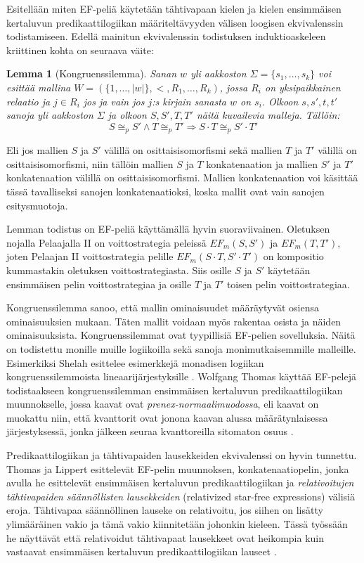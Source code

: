 \documentclass[finnish]{tktltiki2}
\newtheorem{lem}[lau]{Lemma}
\theoremstyle{definition}
\theoremstyle{remark}
\begin{document}
Esitellään miten EF-peliä käytetään tähtivapaan kielen ja kielen ensimmäisen kertaluvun predikaattilogiikan määriteltävyyden välisen loogisen ekvivalenssin todistamiseen. Edellä mainitun ekvivalenssin todistuksen induktioaskeleen kriittinen kohta on seuraava väite:

\begin{lem}[Kongruenssilemma]
Sanan $w$ yli aakkoston $\Sigma = \{s_1, \ldots, s_k\}$ voi esittää mallina $W = (\{1, \ldots, |w|\}, <, R_1, \ldots, R_k)$, jossa $R_i$ on yksipaikkainen relaatio ja $j \in R_i$ jos ja vain jos $j$:s kirjain sanasta $w$ on $s_i$. Olkoon $s, s', t, t'$ sanoja yli aakkoston $\Sigma$ ja olkoon $S, S', T , T'$ näitä kuvailevia malleja. Tällöin: \[ S \cong_p S' \land T \cong_p T' \Longrightarrow S \cdot T \cong_p S' \cdot T' \]
\end{lem}
Eli jos mallien $S$ ja $S'$ välillä on osittaisisomorfismi sekä mallien $T$ ja $T'$ välillä on osittaisisomorfismi, niin tällöin mallien $S$ ja $T$ konkatenaation ja mallien $S'$ ja $T'$ konkatenaation välillä on osittaisisomorfismi. Mallien konkatenaation voi käsittää tässä tavalliseksi sanojen konkatenaatioksi, koska mallit ovat vain sanojen esitysmuotoja.

Lemman todistus on EF-peliä käyttämällä hyvin suoraviivainen. Oletuksen nojalla Pelaajalla II on voittostrategia peleissä $EF_m(S, S')$ ja $EF_m(T, T')$, joten Pelaajan II voittostrategia pelille $EF_m(S \cdot T, S' \cdot T')$ on kompositio kummastakin oletuksen voittostrategiasta. Siis osille $S$ ja $S'$ käytetään ensimmäisen pelin voittostrategiaa ja osille $T$ ja $T'$ toisen pelin voittostrategiaa.

Kongruenssilemma sanoo, että mallin ominaisuudet määräytyvät osiensa ominaisuuksien mukaan. Täten mallit voidaan myös rakentaa osista ja näiden ominaisuuksista. Kongruenssilemmat ovat tyypillisiä EF-pelien sovelluksia. Näitä on todistettu monille muille logiikoilla sekä sanoja monimutkaisemmille malleille. Esimerkiksi Shelah esittelee esimerkkejä monadisen logiikan kongruenssilemmoista lineaarijärjestyksille \cite{She75}. Wolfgang Thomas käyttää EF-pelejä todistaakseen kongruenssilemman ensimmäisen kertaluvun predikaattilogiikan muunnokselle, jossa kaavat ovat \textit{prenex-normaalimuodossa}, eli kaavat on muokattu niin, että kvanttorit ovat jonona kaavan alussa määrätynlaisessa järjestyksessä, jonka jälkeen seuraa kvanttoreilla sitomaton osuus \cite{Tho84}.

Predikaattilogiikan ja tähtivapaiden lausekkeiden ekvivalenssi on hyvin tunnettu. Thomas ja Lippert esittelevät EF-pelin muunnoksen, konkatenaatiopelin, jonka avulla he esittelevät ensimmäisen kertaluvun predikaattilogiikan ja \textit{relativoitujen tähtivapaiden säännöllisten lausekkeiden} (relativized star-free expressions) välisiä eroja. Tähtivapaa säännöllinen lauseke on relativoitu, jos siihen on lisätty ylimääräinen vakio ja tämä vakio kiinnitetään johonkin kieleen. Tässä työssään he näyttävät että relativoidut tähtivapaat lausekkeet ovat heikompia kuin vastaavat ensimmäisen kertaluvun predikaattilogiikan lauseet \cite{Lip88}.
\end{document}
